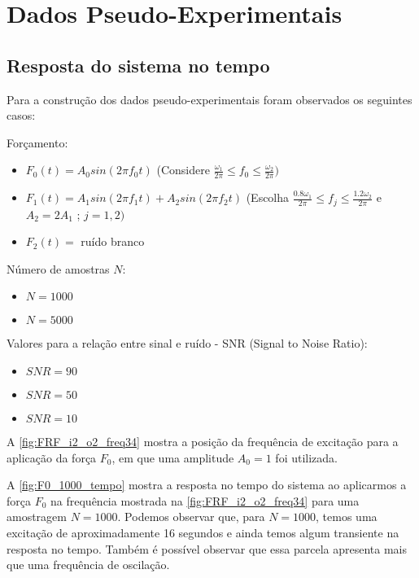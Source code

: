 \chapter{Dados Pseudo-Experimentais}

\section{Resposta do sistema no tempo} \label{Resposta do sistema no tempo}

Para a construção dos dados pseudo-experimentais foram observados os seguintes casos:

Forçamento:
\begin{itemize}
	\item $F_0(t) = A_0 sin(2\pi f_0 t)$ 
	(Considere $\frac{\omega_1}{2\pi} \leq f_0 \leq \frac{\omega_2}{2\pi})$ 
	\item $F_1(t) = A_1 sin(2\pi f_1 t) + A_2 sin(2\pi f_2 t)$ 
	(Escolha 
	$\frac{0.8 \omega_1}{2\pi} \leq f_j \leq \frac{1.2 \omega_2}{2\pi}$ 
	e
	$A_2 = 2A_1$
	;
	$ j = 1, 2)$
	\item $F_2(t) = $ ruído branco
\end{itemize}

Número de amostras $N$:
\begin{itemize}
	\item $N = 1000$
	\item $N = 5000$
\end{itemize}

Valores para a relação entre sinal e ruído -  SNR (Signal to Noise Ratio):
\begin{itemize}
	\item $SNR = 90$
	\item $SNR = 50$
	\item $SNR = 10$
\end{itemize}

A \cref{fig:FRF_i2_o2_freq34} mostra a posição da frequência de excitação para a aplicação da força $F_0$, em que uma amplitude $A_0 = 1$ foi utilizada.

A \cref{fig:F0_1000_tempo} mostra a resposta no tempo do sistema ao aplicarmos a força $F_0$ na frequência mostrada na \cref{fig:FRF_i2_o2_freq34} para uma amostragem $N = 1000$. Podemos observar que, para $N=1000$, temos uma excitação de aproximadamente 16 segundos e ainda temos algum transiente na resposta no tempo. Também é possível observar que essa parcela apresenta mais que uma frequência de oscilação.

